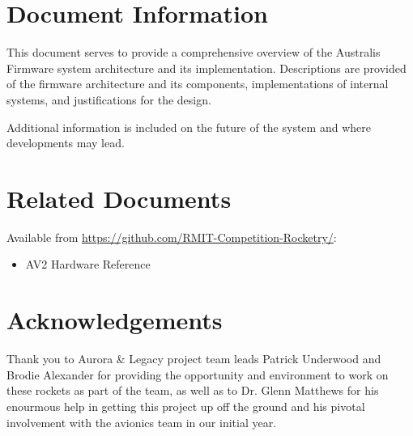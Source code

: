 \documentclass[a4paper, oneside, british]{memoir}
\newcommand{\setdocname}[1]{\def\docname{#1}}
\newcommand{\docname}{}
\newcommand{\setsysname}[1]{\def\sysname{#1}}
\newcommand{\sysname}{}
\newcommand{\setorglabel}[1]{\def\orglabel{#1}}
\newcommand{\orglabel}{}
\newlength{\margindedent}
\numberwithin{figure}{section}
\begin{document}
  \setorglabel{AUSTRALIS AVIONICS} 
  \setsysname{Australis}
  \setdocname{Firmware Design Document}


  \vspace*{-1in}
  \noindent{}

  \vspace*{0.5in}

  \section*{\hspace{-\margindedent}Document Information}
  This document serves to provide a comprehensive overview of the Australis Firmware system architecture and its implementation. Descriptions are provided of the firmware architecture and its components, implementations of internal systems, and justifications for the design. 

  Additional information is included on the future of the system and where developments may lead.
  
  \section*{\hspace{-\margindedent}Related Documents}
  Available from \url{https://github.com/RMIT-Competition-Rocketry/}:
  \vspace{-0.5em}
  \begin{itemize}
    \item AV2 Hardware Reference
  \end{itemize}
  
  \clearpage 

  \vspace*{\fill}

  \section*{\hspace{-\margindedent}Acknowledgements}
  Thank you to Aurora \& Legacy project team leads Patrick Underwood and Brodie Alexander for providing the opportunity and environment to work on these rockets as part of the team, as well as to Dr. Glenn Matthews for his enourmous help in getting this project up off the ground and his pivotal involvement with the avionics team in our initial year. 
\end{document}
